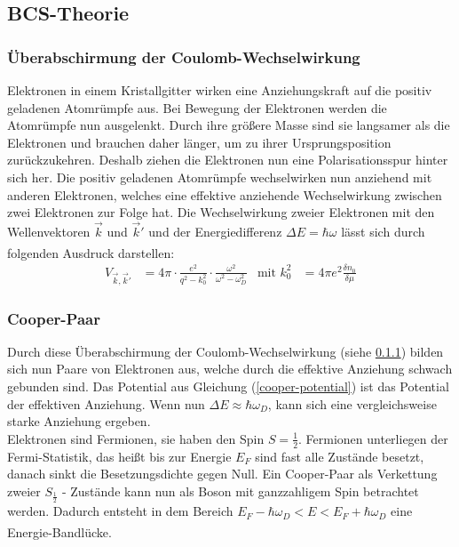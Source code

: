 \documentclass[12pt]{article}
\begin{document}
\subsection{BCS-Theorie \label{BCS}}
\subsubsection{Überabschirmung der Coulomb-Wechselwirkung}\label{ueberabschirmung}
Elektronen in einem Kristallgitter wirken eine Anziehungskraft auf die positiv geladenen Atomrümpfe aus. Bei Bewegung der Elektronen werden die Atomrümpfe nun ausgelenkt. Durch ihre größere Masse sind sie langsamer als die Elektronen und brauchen daher länger, um zu ihrer Ursprungsposition zurückzukehren. Deshalb ziehen die Elektronen nun eine Polarisationsspur hinter sich her. Die positiv geladenen Atomrümpfe wechselwirken nun anziehend mit anderen Elektronen, welches eine effektive anziehende Wechselwirkung zwischen zwei Elektronen zur Folge hat. Die Wechselwirkung zweier Elektronen mit den Wellenvektoren $\vec k$ und $\vec k'$ und der Energiedifferenz $\Delta E=\hbar\omega$ lässt sich durch folgenden Ausdruck darstellen: \textsuperscript{\cite{anleitung}}
\begin{align}
	V_{\vec k,\vec k'}&=4\pi\cdot\frac{e^2}{q^2-k_0^2}\cdot\frac{\omega^2}{\omega^2-\omega_D^2} & \text{mit }k_0^2&=4\pi e^2\frac{\delta n_0}{\delta \mu}\label{cooper-potential}
\end{align}
\subsubsection{Cooper-Paar}
Durch diese Überabschirmung der Coulomb-Wechselwirkung (siehe \ref{ueberabschirmung}) bilden sich nun Paare von Elektronen aus, welche durch die effektive Anziehung schwach gebunden sind. Das Potential aus Gleichung (\ref{cooper-potential}) ist das Potential der effektiven Anziehung. Wenn nun $\Delta E\approx\hbar\omega_D$, kann sich eine vergleichsweise starke Anziehung ergeben.\\

Elektronen sind Fermionen, sie haben den Spin $S=\frac12$. Fermionen unterliegen der Fermi-Statistik, das heißt bis zur Energie $E_F$ sind fast alle Zustände besetzt, danach sinkt die Besetzungsdichte gegen Null.
Ein Cooper-Paar als Verkettung zweier $S_\frac12$ - Zustände kann nun als Boson mit ganzzahligem Spin betrachtet werden. Dadurch entsteht in dem Bereich $E_F-\hbar\omega_D<E<E_F+\hbar\omega_D$ eine Energie-Bandlücke.\textsuperscript{\cite{SQUID}}
\end{document}
